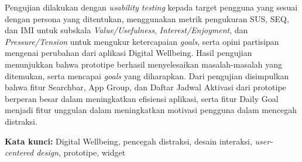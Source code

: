 \begin{singlespace}
  Pengujian dilakukan dengan \textit{usability testing} kepada target pengguna yang sesuai dengan persona yang ditentukan, menggunakan metrik pengukuran SUS, SEQ, dan IMI untuk subskala \textit{Value/Usefulness}, \textit{Interest/Enjoyment}, dan \textit{Pressure/Tension} untuk mengukur ketercapaian \textit{goals}, serta opini partisipan mengenai perubahan dari aplikasi Digital Wellbeing.
  Hasil pengujian menunjukkan bahwa prototipe berhasil menyelesaikan masalah-masalah yang ditemukan, serta mencapai \textit{goals} yang diharapkan.
  Dari pengujian disimpulkan bahwa fitur Searchbar, App Group, dan Daftar Jadwal Aktivasi dari prototipe berperan besar dalam meningkatkan efisiensi aplikasi, serta fitur Daily Goal menjadi fitur unggulan dalam meningkatkan motivasi pengguna dalam mencegah distraksi.

\noindent \textbf{Kata kunci:} Digital Wellbeing, pencegah distraksi, desain interaksi, \textit{user-centered design}, prototipe, widget
\end{singlespace}